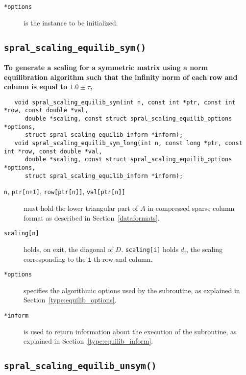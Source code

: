 \begin{description}
   \item[\texttt{*options}] is the instance to be initialized.
\end{description}

\subsection{\texttt{spral\_scaling\_equilib\_sym()}}

\textbf{\noindent
   To generate a scaling for a symmetric matrix using a norm equilibration algorithm such that the infinity norm of each row and column is equal to $1.0\pm\tau$,
}
\vspace*{-0.1cm}
\begin{verbatim}
   void spral_scaling_equilib_sym(int n, const int *ptr, const int *row, const double *val,
      double *scaling, const struct spral_scaling_equilib_options *options,
      struct spral_scaling_equilib_inform *inform);
   void spral_scaling_equilib_sym_long(int n, const long *ptr, const int *row, const double *val,
      double *scaling, const struct spral_scaling_equilib_options *options,
      struct spral_scaling_equilib_inform *inform);
\end{verbatim}

\begin{description}

\item[\texttt{n}, \texttt{ptr[n+1]}, \texttt{row[ptr[n]]}, \texttt{val[ptr[n]]}] must hold the lower triangular part of $A$ in compressed sparse column format as described in Section~\ref{dataformats}.

\item[\texttt{scaling[n]}] holds, on exit, the diagonal of $D$.
\texttt{scaling[i]} holds $d_i$, the scaling corresponding to the
\texttt{i}-th row and column.

\item[\texttt{*options}] specifies the algorithmic options used by the subroutine, as explained in Section~\ref{type:equilib_options}.

\item[\texttt{*inform}] is used to return information about the execution of the subroutine, as explained in Section~\ref{type:equilib_inform}.


\end{description}


\subsection{\texttt{spral\_scaling\_equilib\_unsym()}}

